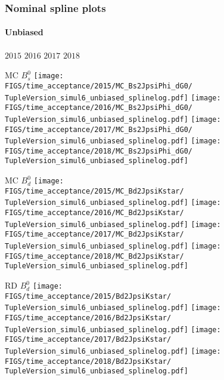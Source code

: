 \begin{frame} %
\frametitle{Nominal spline plots}
\framesubtitle{Unbiased}

  \phantom{2020} \hspace*{1.5cm} $2015$ \hspace*{1.5cm} $2016$ \hspace*{1.5cm} $2017$ \hspace*{1.5cm} $2018$

  MC $B_s^0$
  \texttt{[image: \\FIGS/time\_acceptance/2015/MC\_Bs2JpsiPhi\_dG0/\\TupleVersion\_simul6\_unbiased\_splinelog.pdf]}
  \texttt{[image: \\FIGS/time\_acceptance/2016/MC\_Bs2JpsiPhi\_dG0/\\TupleVersion\_simul6\_unbiased\_splinelog.pdf]}
  \texttt{[image: \\FIGS/time\_acceptance/2017/MC\_Bs2JpsiPhi\_dG0/\\TupleVersion\_simul6\_unbiased\_splinelog.pdf]}
  \texttt{[image: \\FIGS/time\_acceptance/2018/MC\_Bs2JpsiPhi\_dG0/\\TupleVersion\_simul6\_unbiased\_splinelog.pdf]}
  \vspace*{2mm}

  MC $B_d^0$
  \texttt{[image: \\FIGS/time\_acceptance/2015/MC\_Bd2JpsiKstar/\\TupleVersion\_simul6\_unbiased\_splinelog.pdf]}
  \texttt{[image: \\FIGS/time\_acceptance/2016/MC\_Bd2JpsiKstar/\\TupleVersion\_simul6\_unbiased\_splinelog.pdf]}
  \texttt{[image: \\FIGS/time\_acceptance/2017/MC\_Bd2JpsiKstar/\\TupleVersion\_simul6\_unbiased\_splinelog.pdf]}
  \texttt{[image: \\FIGS/time\_acceptance/2018/MC\_Bd2JpsiKstar/\\TupleVersion\_simul6\_unbiased\_splinelog.pdf]}
  \vspace*{2mm}

  RD $B_d^0$
  \texttt{[image: \\FIGS/time\_acceptance/2015/Bd2JpsiKstar/\\TupleVersion\_simul6\_unbiased\_splinelog.pdf]}
  \texttt{[image: \\FIGS/time\_acceptance/2016/Bd2JpsiKstar/\\TupleVersion\_simul6\_unbiased\_splinelog.pdf]}
  \texttt{[image: \\FIGS/time\_acceptance/2017/Bd2JpsiKstar/\\TupleVersion\_simul6\_unbiased\_splinelog.pdf]}
  \texttt{[image: \\FIGS/time\_acceptance/2018/Bd2JpsiKstar/\\TupleVersion\_simul6\_unbiased\_splinelog.pdf]}

\end{frame} %







